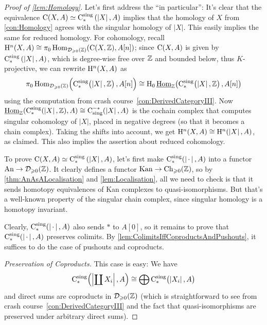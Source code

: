 \begin{proof}[Proof of \cref{lem:Homology}]
	Let's first address the \enquote{in particular}: It's clear that the equivalence $\operatorname{C}(X,A)\simeq \operatorname{C}_*^\mathrm{sing}\left(\left|X\right|,A\right)$ implies that the homology of $X$ from \cref{con:Homology} agrees with the singular homology of $\left|X\right|$. This easily implies the same for reduced homology. For cohomology, recall $\H^n\!\left(X,A\right)\cong \pi_0\Hom_{\Dd_{\geqslant 0}(\IZ)}\lef(\C(X,\IZ),A[n]\righ)$; since $\operatorname{C}(X,A)$ is given by $\operatorname{C}_*^\mathrm{sing}\left(\left|X\right|,A\right)$, which is degree-wise free over $\mathbb{Z}$ and bounded below, thus $K$-projective, we can rewrite $\mathrm{H}^n\!\left(X,A\right)$ as
	\begin{equation*}
		\pi_0\Hom_{\Dd_{\geqslant 0}(\IZ)}\Bigl(\C_*^\mathrm{sing}\lef(\left|X\right|,\IZ\righ),A[n]\Bigr)\cong \H_0\Hhom_\IZ\lef(\C_*^\mathrm{sing}\lef(\left|X\right|,\IZ\righ),A[n]\righ)
	\end{equation*}
	using the computation from crash course~\cref{con:DerivedCategoryIII}. Now $\operatorname{\underline{Hom}}_{\mathbb{Z}}(\operatorname{C}_*^\mathrm{sing}(\left|X\right|,\mathbb{Z}),A)\cong \operatorname{C}_\mathrm{sing}^{-*}(\left|X\right|,A)$ is the cochain complex that computes singular cohomology of $\left|X\right|$, placed in negative degrees (so that it becomes a chain complex). Taking the shifts into account, we get $\mathrm{H}^n(X,A)\cong \mathrm{H}^n(\left|X\right|,A)$, as claimed. This also implies the assertion about reduced cohomology.
	
	To prove $\operatorname{C}(X,A)\simeq \operatorname{C}_*^\mathrm{sing}\left(\left|X\right|,A\right)$, let's first make $\operatorname{C}_*^\mathrm{sing}(\left|\,\cdot\,\right|,A)$ into a functor $\mathrm{An}\rightarrow\mathcal{D}_{\geqslant 0}(\mathbb{Z})$. It clearly defines a functor $\mathrm{Kan}\rightarrow \operatorname{Ch}_{\geqslant 0}(\mathbb{Z})$, so by \cref{thm:AnAsALocalisation} and \cref{lem:Localisation}, all we need to check is that it sends homotopy equivalences of Kan complexes to quasi-isomorphisms. But that's a well-known property of the singular chain complex, since singular homology is a homotopy invariant.
	
	Clearly, $\operatorname{C}_*^\mathrm{sing}(\left|\,\cdot\,\right|,A)$ also sends $*$ to $A[0]$, so it remains to prove that $\operatorname{C}_*^\mathrm{sing}(\left|\,\cdot\,\right|,A)$ preserves colimits. By \cref{lem:ColimitsIffCoproductsAndPushouts}, it suffices to do the case of pushouts and coproducts.
	
	\emph{Preservation of Coproducts.} This case is easy: We have
	\begin{equation*}
		\C_*^\mathrm{sing}\lef(\left|\coprod X_i\right|,A\righ)\cong \bigoplus \C_*^\mathrm{sing}\lef(\left|X_i\right|,A\righ)
	\end{equation*}
	and direct sums are coproducts in $\mathcal{D}_{\geqslant 0}(\mathbb{Z})$ (which is straightforward to see from crash course~\cref{con:DerivedCategoryIII} and the fact that quasi-isomorphisms are preserved under arbitrary direct sums). 
	

\end{proof}

